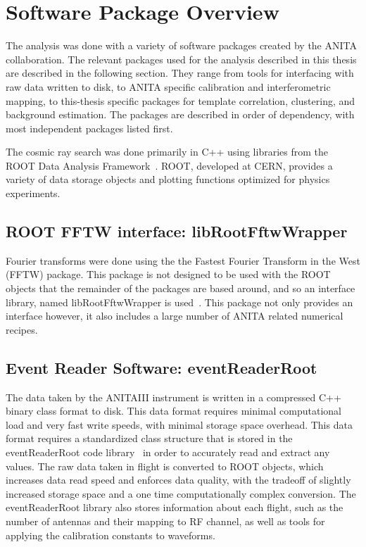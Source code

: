 \section{Software Package Overview}%
	The analysis was done with a variety of software packages created by the ANITA collaboration.  The relevant packages used for the analysis described in this thesis are described in the following section.  They range from tools for interfacing with raw data written to disk, to ANITA specific calibration and interferometric mapping, to this-thesis specific packages for template correlation, clustering, and background estimation.  The packages are described in order of dependency, with most independent packages listed first.
	
	The cosmic ray search was done primarily in C++ using libraries from the ROOT Data Analysis Framework~\cite{ROOT}.  ROOT, developed at CERN, provides a variety of data storage objects and plotting functions optimized for physics experiments.

	\subsection{ROOT FFTW interface: libRootFftwWrapper}
		Fourier transforms were done using the the Fastest Fourier Transform in the West (FFTW) package.  This package is not designed to be used with the ROOT objects that the remainder of the packages are based around, and so an interface library, named libRootFftwWrapper is used~\cite{libRootFftwWrapper}.  This package not only provides an interface however, it also includes a large number of ANITA related numerical recipes.

	\subsection{Event Reader Software: eventReaderRoot}
		The data taken by the ANITAIII instrument is written in a compressed C++ binary class format to disk.  This data format requires minimal computational load and very fast write speeds, with minimal storage space overhead.  This data format requires a standardized class structure that is stored in the eventReaderRoot code library~\cite{eventReaderRoot} in order to accurately read and extract any values.  The raw data taken in flight is converted to ROOT objects, which increases data read speed and enforces data quality, with the tradeoff of slightly increased storage space and a one time computationally complex conversion.  The eventReaderRoot library also stores information about each flight, such as the number of antennas and their mapping to RF channel, as well as tools for applying the calibration constants to waveforms.

